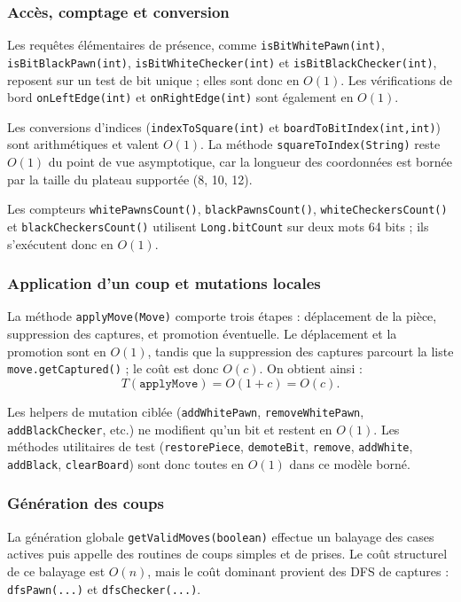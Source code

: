 \documentclass[a4paper]{article}
\begin{document}
\subsubsection{Accès, comptage et conversion}

Les requêtes élémentaires de présence, comme \texttt{isBitWhitePawn(int)}, \texttt{isBitBlackPawn(int)},
\texttt{isBitWhiteChecker(int)} et \texttt{isBitBlackChecker(int)}, reposent sur un test de bit unique ; elles sont donc
en $O(1)$. Les vérifications de bord \texttt{onLeftEdge(int)} et \texttt{onRightEdge(int)} sont également en $O(1)$.

Les conversions d'indices (\texttt{indexToSquare(int)} et \texttt{boardToBitIndex(int,int)}) sont arithmétiques et valent $O(1)$.
La méthode \texttt{squareToIndex(String)} reste $O(1)$ du point de vue asymptotique, car la longueur des coordonnées
est bornée par la taille du plateau supportée (8, 10, 12).

Les compteurs \texttt{whitePawnsCount()}, \texttt{blackPawnsCount()}, \texttt{whiteCheckersCount()} et
\texttt{blackCheckersCount()} utilisent \texttt{Long.bitCount} sur deux mots 64 bits ; ils s'exécutent donc en $O(1)$.

\subsubsection{Application d'un coup et mutations locales}

La méthode \texttt{applyMove(Move)} comporte trois étapes : déplacement de la pièce, suppression des captures,
et promotion éventuelle. Le déplacement et la promotion sont en $O(1)$, tandis que la suppression des captures parcourt
la liste \texttt{move.getCaptured()} ; le coût est donc $O(c)$. On obtient ainsi :
$$T(\texttt{applyMove}) = O(1 + c) = O(c).$$

Les helpers de mutation ciblée (\texttt{addWhitePawn}, \texttt{removeWhitePawn}, \texttt{addBlackChecker}, etc.)
ne modifient qu'un bit et restent en $O(1)$. Les méthodes utilitaires de test
(\texttt{restorePiece}, \texttt{demoteBit}, \texttt{remove}, \texttt{addWhite}, \texttt{addBlack}, \texttt{clearBoard})
sont donc toutes en $O(1)$ dans ce modèle borné.


\subsubsection{Génération des coups}

La génération globale \texttt{getValidMoves(boolean)} effectue un balayage des cases actives puis appelle des routines
de coups simples et de prises. Le coût structurel de ce balayage est $O(n)$, mais le coût dominant provient des DFS
de captures : \texttt{dfsPawn(...)} et \texttt{dfsChecker(...)}.
\end{document}
